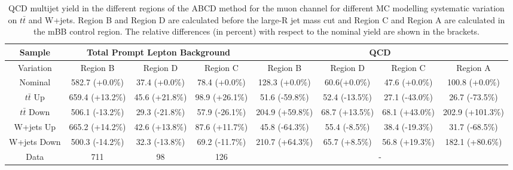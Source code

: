 %
%
\begin{table}[htbp!]
\begin{tiny}
\begin{center}
\begin{tabular}{c|c|c|c||c|c|c|c}
Sample         &\multicolumn{3}{c||}{Total Prompt Lepton Background}      &\multicolumn{4}{c}{QCD}                                          \\
\hline  
Variation      & Region B            & Region D       & Region C       & Region B        & Region D      & Region C       & Region A         \\ 
\hline  
Nominal        & 582.7     (+0.0\%)  & 37.4 (+0.0\%)  & 78.4 (+0.0\%)  & 128.3 (+0.0\%)  & 60.6(+0.0\%)  & 47.6 (+0.0\%)  & 100.8 (+0.0\%) \\
\hline
$t\bar{t}$ Up   & 659.4     (+13.2\%) & 45.6 (+21.8\%) & 98.9 (+26.1\%) & 51.6  (-59.8\%) & 52.4 (-13.5\%) & 27.1 (-43.0\%) & 26.7  (-73.5\%)  \\
$t\bar{t}$ Down & 506.1     (-13.2\%) & 29.3 (-21.8\%) & 57.9 (-26.1\%) & 204.9 (+59.8\%) & 68.7 (+13.5\%) & 68.1 (+43.0\%) & 202.9 (+101.3\%) \\ 
W+jets     Up   & 665.2     (+14.2\%) & 42.6 (+13.8\%) & 87.6 (+11.7\%) & 45.8  (-64.3\%) & 55.4 (-8.5\%)  & 38.4 (-19.3\%) & 31.7  (-68.5\%)  \\
W+jets     Down & 500.3     (-14.2\%) & 32.3 (-13.8\%) & 69.2 (-11.7\%) & 210.7 (+64.3\%) & 65.7 (+8.5\%)  & 56.8 (+19.3\%) & 182.1 (+80.6\%)  \\ 
\hline 
\hline 
Data           & 711  & 98   & 126 &\multicolumn{4}{c}{-} \\ 
\hline  
\end{tabular}
\end{center}
\caption{QCD multijet yield in the different regions of the ABCD method for the muon channel for 
different MC modelling systematic variation on $t\bar{t}$ and W+jets. Region B and Region D are calculated 
before the large-R jet mass cut and Region C and Region A are calculated in the mBB control region. The relative 
differences (in percent) with respect to the nominal yield are shown in the brackets.} 
\label{tab:boosted_qcd_mcmodel_muon_mbbcr}
\end{tiny}
\end{table} 
%
%
